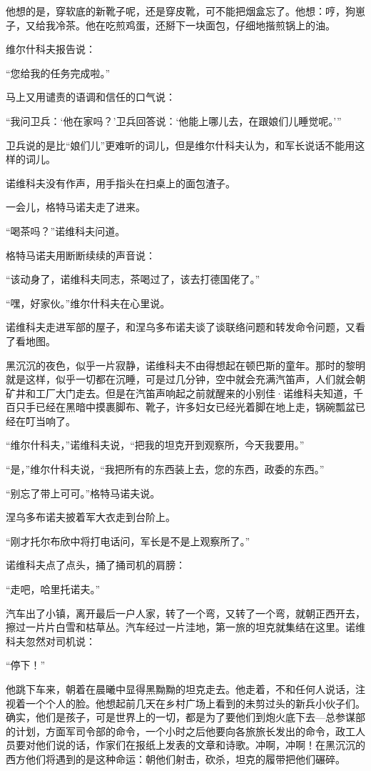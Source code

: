 他想的是，穿软底的新靴子呢，还是穿皮靴，可不能把烟盒忘了。他想：哼，狗崽子，又给我冷茶。他在吃煎鸡蛋，还掰下一块面包，仔细地揩煎锅上的油。

维尔什科夫报告说：

“您给我的任务完成啦。”

马上又用谴责的语调和信任的口气说：

“我问卫兵：‘他在家吗？’卫兵回答说：‘他能上哪儿去，在跟娘们儿睡觉呢。’”

卫兵说的是比“娘们儿”更难听的词儿，但是维尔什科夫认为，和军长说话不能用这样的词儿。

诺维科夫没有作声，用手指头在扫桌上的面包渣子。

一会儿，格特马诺夫走了进来。

“喝茶吗？”诺维科夫问道。

格特马诺夫用断断续续的声音说：

“该动身了，诺维科夫同志，茶喝过了，该去打德国佬了。”

“嘿，好家伙。”维尔什科夫在心里说。

诺维科夫走进军部的屋子，和涅乌多布诺夫谈了谈联络问题和转发命令问题，又看了看地图。

黑沉沉的夜色，似乎一片寂静，诺维科夫不由得想起在顿巴斯的童年。那时的黎明就是这样，似乎一切都在沉睡，可是过几分钟，空中就会充满汽笛声，人们就会朝矿井和工厂大门走去。但是在汽笛声响起之前就醒来的小别佳·诺维科夫知道，千百只手已经在黑暗中摸裹脚布、靴子，许多妇女已经光着脚在地上走，锅碗瓢盆已经在叮当响了。

“维尔什科夫，”诺维科夫说，“把我的坦克开到观察所，今天我要用。”

“是，”维尔什科夫说，“我把所有的东西装上去，您的东西，政委的东西。”

“别忘了带上可可。”格特马诺夫说。

涅乌多布诺夫披着军大衣走到台阶上。

“刚才托尔布欣中将打电话问，军长是不是上观察所了。”

诺维科夫点了点头，捅了捅司机的肩膀：

“走吧，哈里托诺夫。”

汽车出了小镇，离开最后一户人家，转了一个弯，又转了一个弯，就朝正西开去，擦过一片片白雪和枯草丛。汽车经过一片洼地，第一旅的坦克就集结在这里。诺维科夫忽然对司机说：

“停下！”

他跳下车来，朝着在晨曦中显得黑黝黝的坦克走去。他走着，不和任何人说话，注视着一个个人的脸。他想起前几天在乡村广场上看到的未剪过头的新兵小伙子们。确实，他们是孩子，可是世界上的一切，都是为了要他们到炮火底下去—总参谋部的计划，方面军司令部的命令，一个小时之后他要向各旅旅长发出的命令，政工人员要对他们说的话，作家们在报纸上发表的文章和诗歌。冲啊，冲啊！在黑沉沉的西方他们将遇到的是这种命运：朝他们射击，砍杀，坦克的履带把他们碾碎。

